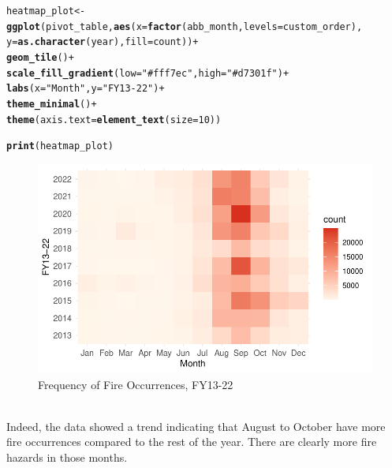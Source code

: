 \documentclass{article}\usepackage[]{graphicx}\usepackage[]{xcolor}
\makeatletter
\def\maxwidth{ %
  \ifdim\Gin@nat@width>\linewidth
    \linewidth
  \else
    \Gin@nat@width
  \fi
}
\newcommand{\hlnum}[1]{\textcolor[rgb]{0.686,0.059,0.569}{#1}}%
\newcommand{\hlstr}[1]{\textcolor[rgb]{0.192,0.494,0.8}{#1}}%
\newcommand{\hlopt}[1]{\textcolor[rgb]{0,0,0}{#1}}%
\newcommand{\hlstd}[1]{\textcolor[rgb]{0.345,0.345,0.345}{#1}}%
\newcommand{\hlkwb}[1]{\textcolor[rgb]{0.69,0.353,0.396}{#1}}%
\newcommand{\hlkwc}[1]{\textcolor[rgb]{0.333,0.667,0.333}{#1}}%
\newcommand{\hlkwd}[1]{\textcolor[rgb]{0.737,0.353,0.396}{\textbf{#1}}}%
\newenvironment{kframe}{%
 \def\at@end@of@kframe{}%
 \ifinner\ifhmode%
  \def\at@end@of@kframe{\end{minipage}}%
  \begin{minipage}{\columnwidth}%
 \fi\fi%
 \def\FrameCommand##1{\hskip\@totalleftmargin \hskip-\fboxsep
 \colorbox{shadecolor}{##1}\hskip-\fboxsep
     \hskip-\linewidth \hskip-\@totalleftmargin \hskip\columnwidth}%
 \MakeFramed {\advance\hsize-\width
   \@totalleftmargin\z@ \linewidth\hsize
   \@setminipage}}%
 {\par\unskip\endMakeFramed%
 \at@end@of@kframe}
\newenvironment{knitrout}{}{} %
\makeatother
\begin{document}
\begin{knitrout}
\color{fgcolor}\begin{kframe}
\begin{alltt}
\hlstd{heatmap_plot} \hlkwb{<-} \hlkwd{ggplot}\hlstd{(pivot_table,} \hlkwd{aes}\hlstd{(}\hlkwc{x} \hlstd{=} \hlkwd{factor}\hlstd{(abb_month,} \hlkwc{levels} \hlstd{= custom_order),}
                                        \hlkwc{y} \hlstd{=} \hlkwd{as.character}\hlstd{(year),} \hlkwc{fill} \hlstd{= count))} \hlopt{+}
  \hlkwd{geom_tile}\hlstd{()} \hlopt{+}
  \hlkwd{scale_fill_gradient}\hlstd{(}\hlkwc{low} \hlstd{=} \hlstr{"#fff7ec"}\hlstd{,} \hlkwc{high} \hlstd{=} \hlstr{"#d7301f"}\hlstd{)} \hlopt{+}
  \hlkwd{labs}\hlstd{(}\hlkwc{x} \hlstd{=} \hlstr{"Month"}\hlstd{,} \hlkwc{y} \hlstd{=} \hlstr{"FY13-22"}\hlstd{)} \hlopt{+}
  \hlkwd{theme_minimal}\hlstd{()} \hlopt{+}
  \hlkwd{theme}\hlstd{(}\hlkwc{axis.text} \hlstd{=} \hlkwd{element_text}\hlstd{(}\hlkwc{size} \hlstd{=} \hlnum{10}\hlstd{))}

\hlkwd{print}\hlstd{(heatmap_plot)}
\end{alltt}
\end{kframe}\begin{figure}
\includegraphics[width=\maxwidth]{figure/fire-by-months-fy13-22-1} \caption[Frequency of Fire Occurrences, FY13-22]{Frequency of Fire Occurrences, FY13-22}\label{fig:fire-by-months-fy13-22}
\end{figure}

\end{knitrout}
\\Indeed, the data showed a trend indicating that August to October have more fire occurrences compared to the rest of the year. There are clearly more fire hazards in those months.
\end{document}
